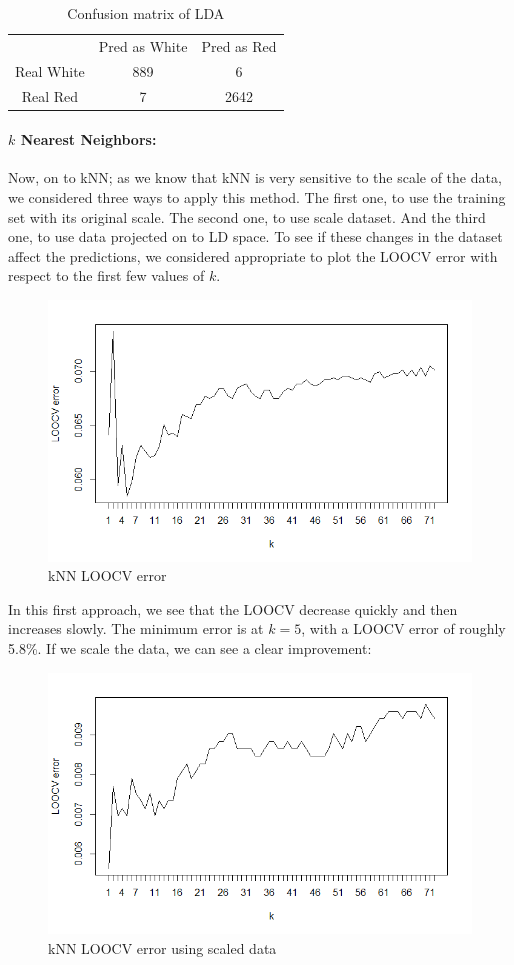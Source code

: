 \documentclass[10pt]{article}
\begin{document}
\begin{table}[H]
\centering
\caption{Confusion matrix of LDA}
\begin{tabular}{ccc}
 & Pred as White & Pred as Red \\
Real White & 889 & 6 \\
Real Red  & 7 & 2642
\end{tabular}
\end{table}

\paragraph{$k$ Nearest Neighbors:}
Now, on to kNN; as we know that kNN is very sensitive to the scale of the data, we considered three ways to apply this method. The first one, to use the training set with its original scale. The second one, to use scale dataset. And the third one, to use data projected on to LD space. To see if these changes in the dataset affect the predictions, we considered appropriate to plot the LOOCV error with respect to the first few values of $k$. 
\begin{figure}[H]
\centering
\caption{kNN LOOCV error}
\includegraphics[scale=0.5]{kNN_LOOCV_error}
\end{figure}
In this first approach, we see that the LOOCV decrease quickly and then increases slowly. The minimum error is at $k=5$, with a LOOCV error of roughly 5.8\%. If we scale the data, we can see a clear improvement:
\begin{figure}[H]
\centering
\caption{kNN LOOCV error using scaled data}
\includegraphics[scale=0.5]{kNN_scaled_LOOCV_error}
\end{figure}
\end{document}

